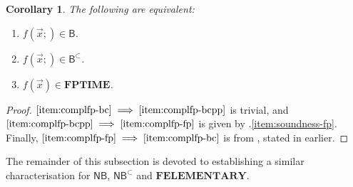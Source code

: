 \documentclass[manuscript,screen]{acmart}
\newtheorem{cor}[thm]{Corollary}
\theoremstyle{definition}
\theoremstyle{remark}
\newcommand{\permpref}{\subset}
\newcommand{\ptime}{\mathbf{PTIME}}
\newcommand{\elementary}{\mathbf{ELEMENTARY}}
\newcommand{\f}{\mathbf{F}}
\newcommand{\fptime}{\f\ptime}
\newcommand{\felementary}{\f\elementary}
\newcommand{\ex}{\mathsf{ex}}
\newcommand{\bc}{\mathsf{B}}
\newcommand{\bcwfpo}[1]{\bc^{#1}}
\newcommand{\nested}{\mathsf{N}}
\newcommand{\nbc}{\nested\bc}
\newcommand{\nbcwfpo}[1]{\nested\bcwfpo{#1}}
\newcommand{\bcpp}{\bcwfpo{\permpref}}
\newcommand{\nbcpp}{\nbcwfpo{\permpref}}
\begin{document}
\begin{cor}\label{cor:bcpp-bc-fptime}
The following are equivalent:
\begin{enumerate}
    \item\label{item:complfp-bc} $f(\vec x;) \in \bc$.
    \item\label{item:complfp-bcpp} $f(\vec x;) \in \bcpp$.
    \item\label{item:complfp-fp} $f(\vec x) \in \fptime$.
\end{enumerate}
\end{cor}
\begin{proof}
$\eqref{item:complfp-bc}\implies \eqref{item:complfp-bcpp}$ is trivial, and $\eqref{item:complfp-bcpp} \implies \eqref{item:complfp-fp}$ is given by .\eqref{item:soundness-fp}.
Finally, $\eqref{item:complfp-fp} \implies \eqref{item:complfp-bc}$ is from \cite{BellantoniCook}, stated in  earlier.
\end{proof}

The remainder of this subsection is devoted to establishing a similar characterisation for $\nbc$, $ \nbcpp$ and $\felementary$.



\end{document}

